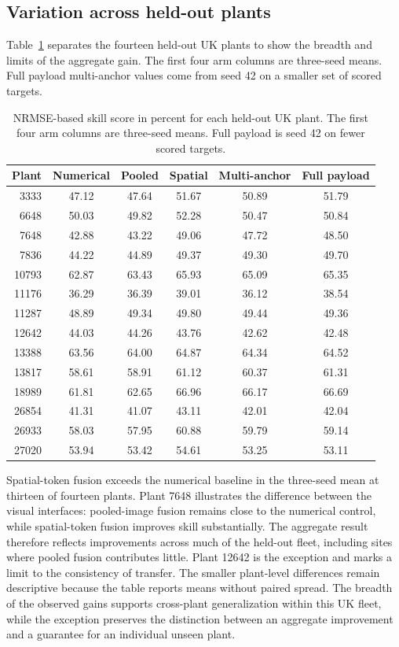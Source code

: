 \subsection{Variation across held-out plants}

Table~\ref{tab:per-plant-ladder} separates the fourteen held-out UK plants to show the breadth and limits of the aggregate gain. The first four arm columns are three-seed means. Full payload multi-anchor values come from seed 42 on a smaller set of scored targets.

\begin{table}[htbp]
\centering
\begin{tabular}{rccccc}
\hline
Plant & Numerical & Pooled & Spatial & Multi-anchor & Full payload \\
\hline
3333 & 47.12 & 47.64 & 51.67 & 50.89 & 51.79 \\
6648 & 50.03 & 49.82 & 52.28 & 50.47 & 50.84 \\
7648 & 42.88 & 43.22 & 49.06 & 47.72 & 48.50 \\
7836 & 44.22 & 44.89 & 49.37 & 49.30 & 49.70 \\
10793 & 62.87 & 63.43 & 65.93 & 65.09 & 65.35 \\
11176 & 36.29 & 36.39 & 39.01 & 36.12 & 38.54 \\
11287 & 48.89 & 49.34 & 49.80 & 49.44 & 49.36 \\
12642 & 44.03 & 44.26 & 43.76 & 42.62 & 42.48 \\
13388 & 63.56 & 64.00 & 64.87 & 64.34 & 64.52 \\
13817 & 58.61 & 58.91 & 61.12 & 60.37 & 61.31 \\
18989 & 61.81 & 62.65 & 66.96 & 66.17 & 66.69 \\
26854 & 41.31 & 41.07 & 43.11 & 42.01 & 42.04 \\
26933 & 58.03 & 57.95 & 60.88 & 59.79 & 59.14 \\
27020 & 53.94 & 53.42 & 54.61 & 53.25 & 53.11 \\
\hline
\end{tabular}
\caption{NRMSE-based skill score in percent for each held-out UK plant. The first four arm columns are three-seed means. Full payload is seed 42 on fewer scored targets.}
\label{tab:per-plant-ladder}
\end{table}

Spatial-token fusion exceeds the numerical baseline in the three-seed mean at thirteen of fourteen plants. Plant 7648 illustrates the difference between the visual interfaces: pooled-image fusion remains close to the numerical control, while spatial-token fusion improves skill substantially. The aggregate result therefore reflects improvements across much of the held-out fleet, including sites where pooled fusion contributes little. Plant 12642 is the exception and marks a limit to the consistency of transfer. The smaller plant-level differences remain descriptive because the table reports means without paired spread. The breadth of the observed gains supports cross-plant generalization within this UK fleet, while the exception preserves the distinction between an aggregate improvement and a guarantee for an individual unseen plant.

